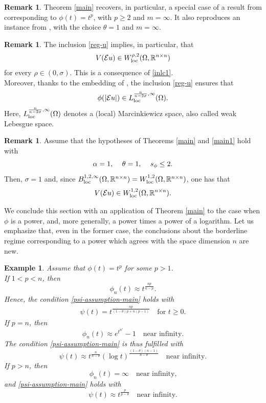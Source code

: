 \documentclass[leqno,11pt]{amsart}%
\numberwithin{equation}{section}
\def\E{\mathcal{E}}
\newtheorem{ex}[thm]{Example}
\theoremstyle{definition}
\newtheorem{rem}[thm]{Remark}
\numberwithin{equation}{section}
\begin{document}
\begin{rem}
    \label{recover}
    Theorem \ref{main} recovers, in particular, a special case of a result from \cite{GPS2} corresponding to  $\phi(t)=t^p$, with $p \geq 2$ and $m=\infty$. It also reproduces an instance   from \cite{GPS}, with the choice $\theta =1$  and $m=\infty$. 
\end{rem}
\begin{rem}
    \label{gradient-int}
The inclusion \eqref{reg-u} implies, in particular, that
\begin{align}
    \label{oct20}
    V(\E u) \in W^{\rho,2}_{\rm loc}(\Omega, \mathbb R^{n\times n})
\end{align}
for every $\rho \in (0,\sigma)$. This is a consequence of \eqref{inlc1}. 
\\ Moreover, thanks to the embedding of \cite[Theorem 8.1]{peetre}, the inclusion \eqref{reg-u} ensures that
\begin{align}
    \label{oct21}
    \phi(|\E u|) \in L^{\frac{n}{n-2\sigma}, \infty}_{\rm loc}(\Omega).
\end{align}
Here, $L^{\frac{n}{n-2\sigma}, \infty}_{\rm loc}(\Omega)$ denotes a (local) Marcinkiewicz space, also called weak Lebesgue space.
\end{rem}


\begin{rem}\label{sobolev-reg}
Assume that the  hypotheses of Theorems \ref{main} and \ref{main1} hold with $$\text{$\alpha =1$, \quad $\theta =1$, \quad  $s_\phi\leq 2$}.$$ Then, $\sigma=1$ and, since $B_{\rm loc}^{1,2,\infty}(\Omega, \mathbb R^{n\times n})= W^{1,2}_{\rm loc}(\Omega, \mathbb R^{n\times n})$, one has   that $$V(\E u) \in W^{1,2}_{\rm loc}(\Omega, \mathbb R^{n\times n}).$$
\end{rem}

We conclude this section with an application of Theorem \ref{main} to the case when $\phi$ is a power, and, more generally, a power times a power of a logarithm. Let us emphasize that, even in the former case, the conclusions about the borderline regime corresponding to a power which agrees with  the space dimension  $n$ are new. 

\begin{ex} {\rm Assume that 
$\phi (t)=t^p$ for some $p>1$.
\\ If $1<p<n$, then
$$\phi_n (t) \approx t^{\frac{np}{n-p}}.$$
Hence, the condition \eqref{psi-assumption-main}  holds with
\begin{align}
    \label{psi1}
    \psi (t) = t^{\frac{np}{({1-\theta}) p + n(p-1)}} \quad \text{for $t \geq 0$.}
\end{align}
 If $p=n$, then
$$\phi_n (t) \approx e^{t^{n'}}-1 \quad \text{near infinity.}$$
 The condition \eqref{psi-assumption-main} is thus fulfilled with 
$$\psi (t) \approx t^{\frac n{n-\theta}}(\log t)^{\frac{({1-\theta})(n-1)}{n- \theta}} \quad \text{near infinity.}$$
If $p>n$, then 
$$\phi_n(t) = \infty \quad \text{near infinity,}$$
and \eqref{psi-assumption-main} holds with
$$\psi (t) \approx t^{\frac{p}{p-\theta}} \quad \text{near infinity.}$$
}
\end{ex}
\end{document}
